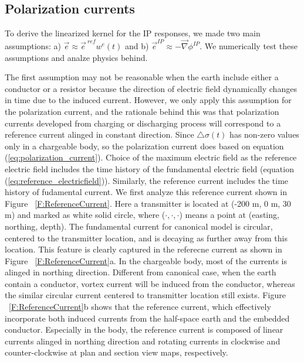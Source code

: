 \documentclass[a4paper, 11pt]{article}
\newcommand{\grad}{\vec \nabla}
\newcommand{\dsig}{\triangle\sigma}
\newcommand {\e}  { {\vec e} }
\newcommand{\eref}{\e^{\ ref}}
\begin{document}
\clearpage

\subsection{Polarization currents}
To derive the linearized kernel for the IP responses, we made two main assumptions: a) $\e \approx \eref w^e(t)$ and b) $\e^{IP} \approx -\grad\phi^{IP}$. We numerically test these assumptions and analze physics behind.

The first assumption may not be reasonable when the earth include either a conductor or a resistor because the direction of electric field dynamically changes in time due to the induced current. 
However, we only apply this assumption for the polarization current, and the rationale behind this was that polarization currents developed from charging or discharging process will correspond to a reference current alinged in constant direction. 
Since $\dsig(t)$ has non-zero values only in a chargeable body, so the polarization current does based on equation (\ref{eq:polarization_current}). 
Choice of the maximum electric field as the reference electric field includes the time history of the fundamental electric field (equation (\ref{eq:reference_electricfield})). 
Similarly, the reference current includes the time history of  fudamental current. 
We first analyze this reference current shown in Figure ~\ref{F:ReferenceCurrent}. 
Here a transmitter is located at (-200 m, 0 m, 30 m) and marked as white solid circle, where ($\cdot, \cdot, \cdot$) means a point at (easting, northing, depth).  
The fundamental current for canonical model is circular, centered to the transmitter location, and is decaying as further away from this location. This feature is clearly captured in the referecne current as shown in Figure ~\ref{F:ReferenceCurrent}a. 
In the chargeable body, most of the currents is alinged in northing direction. 
Different from canonical case, when the earth contain a conductor, vortex current will be induced from the conductor, whereas the similar circular current centered to transmitter location still exists.  
Figure ~\ref{F:ReferenceCurrent}b shows that the reference current, which effectively incorporate both induced currents from the half-space earth and the embedded conductor.  
Especially in the body, the reference current is composed of linear currents alinged in northing direction and rotating currents in clockwise and counter-clockwise at plan and section view maps, respectively. 
\end{document}
